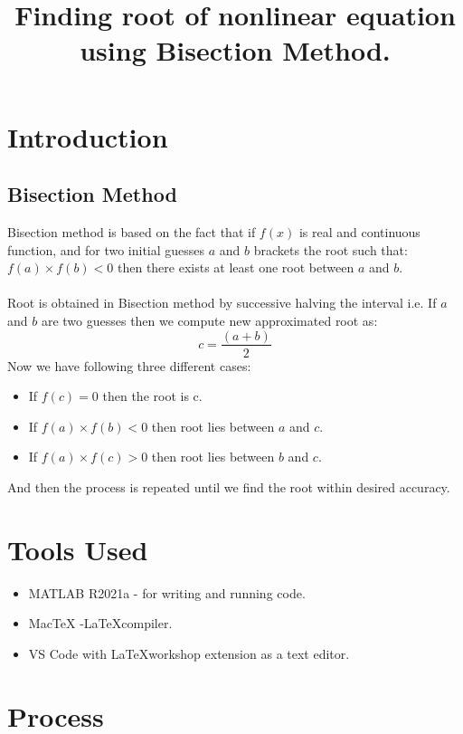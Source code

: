 \clearpage
\title{Finding root of nonlinear equation using Bisection Method.}
\author{}
\date{}
\maketitle

\section*{Introduction}
\subsection*{Bisection Method}
Bisection method is based on the fact that if $f(x)$ is real and continuous function, and for two initial guesses $a$ and $b$ brackets the root such that: $f(a)\times f(b)< 0$ then there exists at least one root between $a$ and $b$.\\\\
Root is obtained in Bisection method by successive halving the interval i.e. If $a$ and $b$ are two guesses then we compute new approximated root as:
\[c = \frac{(a+b)}{2}\]
Now we have following three different cases:
\begin{itemize}
    \item If $f(c)=0$ then the root is c.
    \item If $f(a)\times f(b)< 0$ then root lies between $a$ and $c$.
    \item If $f(a)\times f(c)> 0$ then root lies between $b$ and $c$.
\end{itemize}
And then the process is repeated until we find the root within desired accuracy.\cite{bisec}

\section*{Tools Used}
\begin{itemize}
    \item MATLAB R2021a - for writing and running code.
    \item MacTeX -\LaTeX  compiler.
    \item VS Code with \LaTeX workshop extension as a text editor.
\end{itemize}

\section*{Process}

